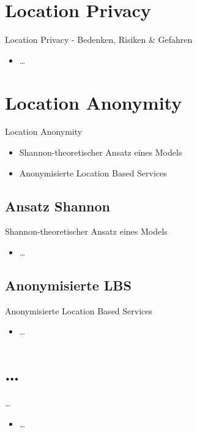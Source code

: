 \section{Location Privacy}
\begin{frame}{Location Privacy - Bedenken, Risiken \& Gefahren}
\begin{itemize}
  \item \dots
\end{itemize}
\end{frame}

\section{Location Anonymity}
\begin{frame}{Location Anonymity}
\begin{itemize}
  \item Shannon-theoretischer Ansatz eines Models
  \item Anonymisierte Location Based Services
\end{itemize}
\end{frame}

\subsection{Ansatz Shannon}
\begin{frame}{Shannon-theoretischer Ansatz eines Models}
\begin{itemize}
  \item \dots
\end{itemize}
\end{frame}

\subsection{Anonymisierte LBS}
\begin{frame}{Anonymisierte Location Based Services}
\begin{itemize}
  \item \dots
\end{itemize}
\end{frame}

\section{\dots}
\begin{frame}{\dots}
\begin{itemize}
  \item \dots
\end{itemize}
\end{frame}

